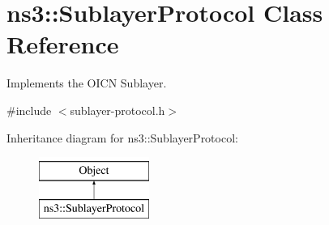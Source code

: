 \hypertarget{classns3_1_1SublayerProtocol}{\section{ns3\-:\-:Sublayer\-Protocol Class Reference}
\label{classns3_1_1SublayerProtocol}
}


Implements the O\-I\-C\-N Sublayer.  




{\ttfamily \#include $<$sublayer-\/protocol.\-h$>$}

Inheritance diagram for ns3\-:\-:Sublayer\-Protocol\-:\begin{figure}[H]
\begin{center}
\leavevmode
\includegraphics[height=2.000000cm]{classns3_1_1SublayerProtocol}
\end{center}
\end{figure}
